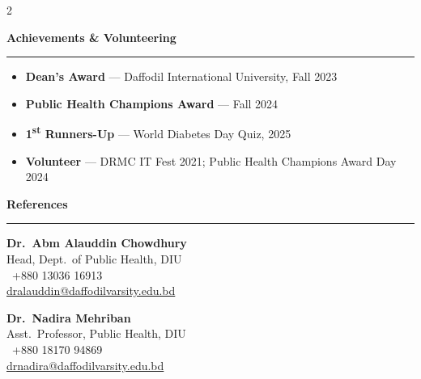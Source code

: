 \documentclass[10pt, a4paper]{article}
\newlength{\innerMainW}         %
\newcommand{\rsection}[1]{%
  \vspace{7pt}%
  {\large\bfseries\color{accent}#1}\\[-5pt]%
  {\color{rulecolor}\rule{\innerMainW}{0.5pt}}%
  \vspace{2pt}%
}
\begin{document}
\begin{paracol}{2}
\begin{rightcolumn}
\begin{minipage}{\innerMainW}
\rsection{Achievements \& Volunteering}
{\small
\begin{itemize}
  \item \textbf{Dean's Award} — Daffodil International University, Fall 2023
  \item \textbf{Public Health Champions Award} — Fall 2024
  \item \textbf{1\textsuperscript{st} Runners-Up} — World Diabetes Day Quiz, 2025
  \item \textbf{Volunteer} — DRMC IT Fest 2021; Public Health Champions Award Day 2024
\end{itemize}
}

\rsection{References}
{\small
\begin{minipage}[t]{0.47\innerMainW}
  \textbf{Dr.\ Abm Alauddin Chowdhury}\\
  Head, Dept.\ of Public Health, DIU\\
  {\footnotesize\faPhone\ +880 13036 16913}\\
  {\footnotesize\href{mailto:dralauddin@daffodilvarsity.edu.bd}{dralauddin@daffodilvarsity.edu.bd}}
\end{minipage}\hfill
\begin{minipage}[t]{0.47\innerMainW}
  \textbf{Dr.\ Nadira Mehriban}\\
  Asst.\ Professor, Public Health, DIU\\
  {\footnotesize\faPhone\ +880 18170 94869}\\
  {\footnotesize\href{mailto:drnadira@daffodilvarsity.edu.bd}{drnadira@daffodilvarsity.edu.bd}}
\end{minipage}
}

\end{minipage}
\end{rightcolumn}
\end{paracol}
\end{document}
